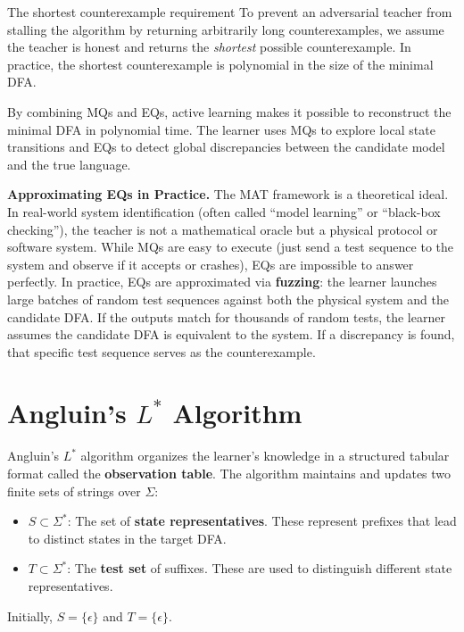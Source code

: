 \begin{intermezzo}{The shortest counterexample requirement}
To prevent an adversarial teacher from stalling the algorithm by returning arbitrarily long counterexamples, we assume the teacher is honest and returns the \emph{shortest} possible counterexample. In practice, the shortest counterexample is polynomial in the size of the minimal DFA.
\end{intermezzo}

By combining MQs and EQs, active learning makes it possible to reconstruct the minimal DFA in polynomial time. The learner uses MQs to explore local state transitions and EQs to detect global discrepancies between the candidate model and the true language.

\medskip\noindent
\textbf{Approximating EQs in Practice.} The MAT framework is a theoretical ideal. In real-world system identification (often called ``model learning'' or ``black-box checking''), the teacher is not a mathematical oracle but a physical protocol or software system. While MQs are easy to execute (just send a test sequence to the system and observe if it accepts or crashes), EQs are impossible to answer perfectly. In practice, EQs are approximated via \textbf{fuzzing}: the learner launches large batches of random test sequences against both the physical system and the candidate DFA. If the outputs match for thousands of random tests, the learner assumes the candidate DFA is equivalent to the system. If a discrepancy is found, that specific test sequence serves as the counterexample.

\section{Angluin's $L^*$ Algorithm}
\label{sec:lstar-algorithm}

Angluin's $L^*$ algorithm organizes the learner's knowledge in a structured tabular format called the \textbf{observation table}. The algorithm maintains and updates two finite sets of strings over $\Sigma$:
\begin{itemize}
  \item $S \subset \Sigma^*$: The set of \textbf{state representatives}. These represent prefixes that lead to distinct states in the target DFA.
  \item $T \subset \Sigma^*$: The \textbf{test set} of suffixes. These are used to distinguish different state representatives.
\end{itemize}
Initially, $S = \{\epsilon\}$ and $T = \{\epsilon\}$.

